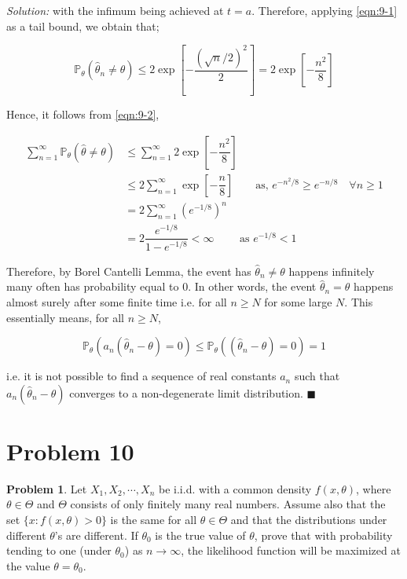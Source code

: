 \documentclass[12pt]{article}
\newcommand{\prob}{\mathbb{P}}
\theoremstyle{definition}
\newtheorem*{prb}{Problem}
\newenvironment{problem}{\begin{tcolorbox}[colback=blue!5!white,colframe=blue!75!black, parbox = true] \begin{prb}  }{\end{prb}\end{tcolorbox} }
\newenvironment{answer}{\textit{Solution: }\quad }{ \hfill $\blacksquare$}
\numberwithin{equation}{section}
\begin{document}
\begin{answer}
    with the infimum being achieved at $t = a$. Therefore, applying \cref{eqn:9-1} as a tail bound, we obtain that;

    \begin{equation}
        \prob_{\theta}(\widehat{\theta}_n \neq \theta) \leq 2 \exp\left[ - \dfrac{(\sqrt{n}/2)^2}{2} \right] = 2 \exp\left[ - \dfrac{n^2}{8} \right]
        \label{eqn:9-2}
    \end{equation}

    Hence, it follows from \cref{eqn:9-2},

    \begin{align*}
        \sum_{n=1}^{\infty} \prob_{\theta}(\widehat{\theta} \neq \theta)
        & \leq \sum_{n=1}^{\infty} 2 \exp\left[ - \dfrac{n^2}{8} \right]\\
        & \leq 2 \sum_{n=1}^{\infty} \exp\left[ - \dfrac{n}{8} \right] \qquad \text{as, } e^{-n^2/8} \geq e^{-n/8} \quad \forall n \geq 1\\
        & = 2 \sum_{n=1}^{\infty} \left(e^{-1/8}\right)^n\\
        & = 2 \dfrac{e^{-1/8}}{1 - e^{-1/8}} < \infty \qquad \text{ as } e^{-1/8} < 1
    \end{align*}

    Therefore, by Borel Cantelli Lemma, the event has $\widehat{\theta}_n \neq \theta$ happens infinitely many often has probability equal to 0. In other words, the event $\widehat{\theta}_n = \theta$ happens almost surely after some finite time i.e. for all $n \geq N$ for some large $N$. This essentially means, for all $n \geq N$, 

    $$
    \prob_\theta\left(a_n(\widehat{\theta}_n - \theta) = 0\right)
    \leq \prob_{\theta} \left( (\widehat{\theta}_n - \theta) = 0 \right)
    = 1
    $$

    i.e. it is not possible to find a sequence of real constants $a_n$ such that $a_n(\widehat{\theta}_n - \theta)$ converges to a non-degenerate limit distribution.
\end{answer}

\pagebreak
\section{Problem 10}

\begin{problem}
Let $X_1,X_2,\cdots,X_n$ be i.i.d. with a common density $f(x,\theta)$, where $\theta \in \Theta$ and $\Theta$ consists of only finitely many real numbers. Assume also that the set $\{x : f(x, \theta) > 0\}$ is the same for all $\theta \in \Theta$ and that the distributions under different $\theta$’s are different. If $\theta_0$ is the true value of $\theta$, prove that with
probability tending to one (under $\theta_0$) as $n\rightarrow\infty$, the likelihood function will be maximized at the value $\theta = \theta_0$.
\end{problem}
\end{document}
